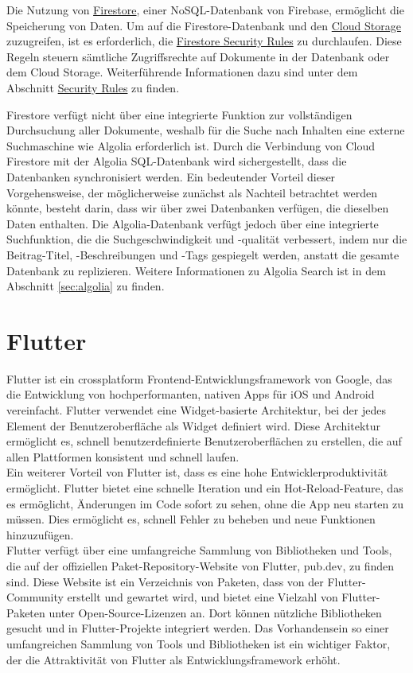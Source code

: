 Die Nutzung von
\href{https://firebase.google.com/docs/firestore}{Firestore},
einer NoSQL-Datenbank von Firebase, ermöglicht die
Speicherung von Daten. Um auf die Firestore-Datenbank und
den \href{https://firebase.google.com/docs/storage}{Cloud
    Storage} zuzugreifen, ist es erforderlich, die
\href{https://firebase.google.com/docs/firestore/security/overview}{Firestore
    Security Rules} zu durchlaufen. Diese Regeln steuern
sämtliche Zugriffsrechte auf Dokumente in der Datenbank oder
dem Cloud Storage. Weiterführende Informationen dazu sind
unter dem Abschnitt \hyperref[sec:security-rules]{Security Rules} zu
finden.

Firestore verfügt nicht über eine integrierte Funktion zur
vollständigen Durchsuchung aller Dokumente, weshalb für die
Suche nach Inhalten eine externe Suchmaschine wie Algolia
erforderlich ist. Durch die Verbindung von Cloud Firestore
mit der Algolia SQL-Datenbank wird sichergestellt, dass die
Datenbanken synchronisiert werden. Ein bedeutender Vorteil
dieser Vorgehensweise, der möglicherweise zunächst als
Nachteil betrachtet werden könnte, besteht darin, dass wir
über zwei Datenbanken verfügen, die dieselben Daten
enthalten. Die Algolia-Datenbank verfügt jedoch über eine
integrierte Suchfunktion, die die Suchgeschwindigkeit und
-qualität verbessert, indem nur die Beitrag-Titel,
-Beschreibungen und -Tags gespiegelt werden, anstatt die
gesamte Datenbank zu replizieren. Weitere Informationen zu
Algolia Search ist in dem Abschnitt \ref{sec:algolia} zu finden.

\section{Flutter}

Flutter ist ein crossplatform Frontend-Entwicklungsframework von Google, das die Entwicklung von hochperformanten, nativen Apps für iOS und Android vereinfacht. Flutter verwendet eine Widget-basierte Architektur, bei der jedes Element der Benutzeroberfläche als Widget definiert wird. Diese Architektur ermöglicht es, schnell benutzerdefinierte Benutzeroberflächen zu erstellen, die auf allen Plattformen konsistent und schnell laufen.
\\
Ein weiterer Vorteil von Flutter ist, dass es eine hohe Entwicklerproduktivität ermöglicht. Flutter bietet eine schnelle Iteration und ein Hot-Reload-Feature, das es ermöglicht, Änderungen im Code sofort zu sehen, ohne die App neu starten zu müssen. Dies ermöglicht es, schnell Fehler zu beheben und neue Funktionen hinzuzufügen.
\\
Flutter verfügt über eine umfangreiche Sammlung von Bibliotheken und Tools, die auf der offiziellen Paket-Repository-Website von Flutter, pub.dev, zu finden sind. Diese Website ist ein Verzeichnis von Paketen, dass von der Flutter-Community erstellt und gewartet wird, und bietet eine Vielzahl von Flutter-Paketen unter Open-Source-Lizenzen an. Dort können nützliche Bibliotheken gesucht und in Flutter-Projekte integriert werden. Das Vorhandensein so einer umfangreichen Sammlung von Tools und Bibliotheken ist ein wichtiger Faktor, der die Attraktivität von Flutter als Entwicklungsframework erhöht.

